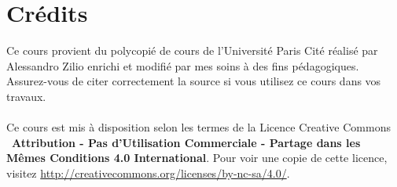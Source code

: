 \documentclass{article}
\begin{document}
\newpage
\tableofcontents
\section*{Crédits}
Ce cours provient du polycopié de cours de l'Université Paris Cité réalisé par Alessandro Zilio enrichi et modifié par mes soins à des fins pédagogiques. Assurez-vous de citer correctement la source si vous utilisez ce cours dans vos travaux.\\\\
Ce cours est mis à disposition selon les termes de la Licence Creative Commons \ccbyncsa\ \textbf{Attribution - Pas d'Utilisation Commerciale - Partage dans les Mêmes Conditions 4.0 International}. 
Pour voir une copie de cette licence, visitez \url{http://creativecommons.org/licenses/by-nc-sa/4.0/}.
\end{document}
